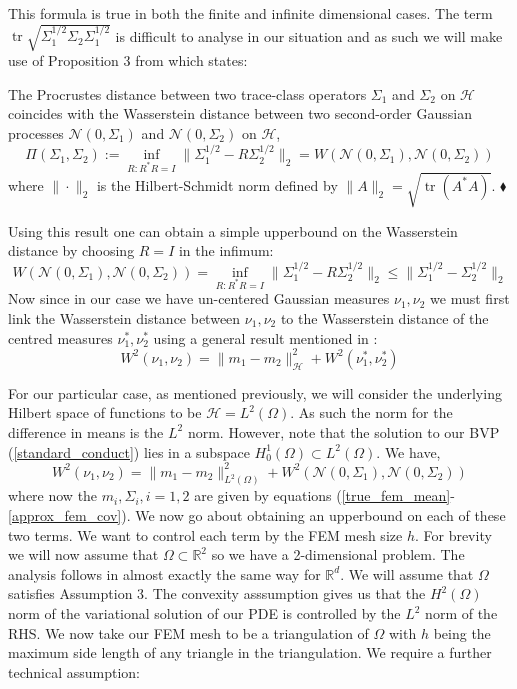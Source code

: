 This formula is true in both the finite and infinite dimensional cases. The term $\operatorname{tr}\sqrt{\Sigma_{1}^{1/2}\Sigma_{2}\Sigma_{1}^{1/2}}$ is difficult to analyse in our situation and as such we will make use of Proposition 3 from \textcolor{blue}{\citep{masarotto2019procrustes}} which states: \vspace{5pt}
\begin{proposition}
    The Procrustes distance between two trace-class operators $\Sigma_{1}$ and $\Sigma_{2}$ on $\mathcal{H}$ coincides with the Wasserstein distance between two second-order Gaussian processes $\mathcal{N}(0,\Sigma_{1})$ and $\mathcal{N}(0,\Sigma_2)$ on $\mathcal{H}$,
    $$\Pi(\Sigma_{1},\Sigma_{2}):=\inf_{R:R^{*}R=I}\|\Sigma_{1}^{1/2}-R\Sigma_{2}^{1/2}\|_{2}=W(\mathcal{N}(0,\Sigma_{1}),\mathcal{N}(0,\Sigma_{2}))$$
    where $\|\cdot\|_{2}$ is the Hilbert-Schmidt norm defined by $\|A\|_{2}=\sqrt{\operatorname{tr}(A^{*}A)}$. $\mathbin{\blacklozenge}$
\end{proposition}

Using this result one can obtain a simple upperbound on the Wasserstein distance by choosing $R=I$ in the infimum:
\begin{equation}
    W(\mathcal{N}(0,\Sigma_1),\mathcal{N}(0,\Sigma_2))=\inf_{R:R^{*}R=I}\|\Sigma_{1}^{1/2}-R\Sigma_{2}^{1/2}\|_{2} \leq \|\Sigma_{1}^{1/2}-\Sigma_{2}^{1/2}\|_{2}
\end{equation}
Now since in our case we have un-centered Gaussian measures $\nu_1,\nu_2$ we must first link the Wasserstein distance between $\nu_1,\nu_2$ to the Wasserstein distance of the centred measures $\nu_{1}^{*},\nu_{2}^{*}$ using a general result mentioned in \textcolor{blue}{\citep{cuesta1996lower}}:
\begin{equation}
    W^{2}(\nu_1,\nu_2)=\|m_1-m_2\|_{\mathcal{H}}^{2}+W^{2}(\nu_{1}^{*},\nu_{2}^{*})
\end{equation}

For our particular case, as mentioned previously, we will consider the underlying Hilbert space of functions to be $\mathcal{H}=L^2(\Omega)$. As such the norm for the difference in means is the $L^2$ norm. However, note that the solution to our BVP (\ref{standard_conduct}) lies in a subspace $H_{0}^{1}(\Omega)\subset L^{2}(\Omega)$. We have,
\begin{equation}
    W^{2}(\nu_1,\nu_2)=\|m_1-m_2\|_{L^{2}(\Omega)}^{2}+W^{2}(\mathcal{N}(0,\Sigma_1),\mathcal{N}(0,\Sigma_2))
\end{equation}
where now the $m_{i},\Sigma_{i}, i=1,2$ are given by equations (\ref{true_fem_mean}-\ref{approx_fem_cov}). We now go about obtaining an upperbound on each of these two terms. We want to control each term by the FEM mesh size $h$. For brevity we will now assume that $\Omega\subset\mathbb{R}^2$ so we have a 2-dimensional problem. The analysis follows in almost exactly the same way for $\mathbb{R}^{d}$. We will assume that $\Omega$ satisfies Assumption 3. The convexity asssumption gives us that the $H^{2}(\Omega)$ norm of the variational solution of our PDE is controlled by the $L^2$ norm of the RHS. We now take our FEM mesh to be a triangulation of $\Omega$ with $h$ being the maximum side length of any triangle in the triangulation. We require a further technical assumption:

